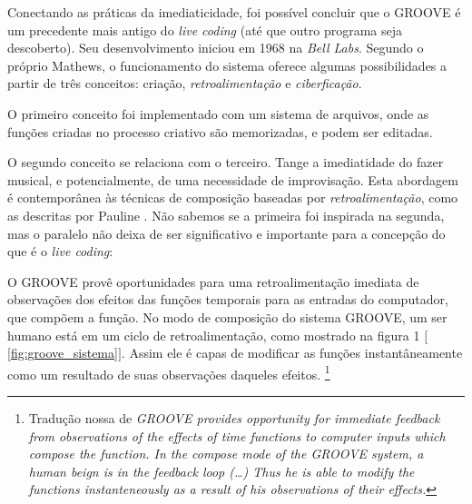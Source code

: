 Conectando as práticas da imediaticidade, foi possível concluir que o GROOVE \cite{mathews_groove_1970,di_nunzio_genesi_2010} é um precedente mais antigo do \emph{live coding} (até que outro programa seja descoberto). Seu desenvolvimento iniciou em 1968 na \emph{Bell Labs}. Segundo o próprio Mathews, o funcionamento do sistema oferece algumas possibilidades a partir de três conceitos: criação, \emph{retroalimentação} e \emph{ciberficação}. 

O primeiro conceito foi implementado com um sistema de arquivos, onde as funções criadas no processo criativo são memorizadas, e podem ser editadas.

O segundo conceito se relaciona com o terceiro. Tange a imediatidade do fazer musical, e potencialmente, de uma necessidade de improvisação. Esta abordagem é contemporânea às técnicas de composição baseadas por \emph{retroalimentação}, como as descritas por Pauline . Não sabemos se a primeira foi inspirada na segunda, mas o paralelo não deixa de ser significativo e importante para a concepção do que é o \emph{live coding}:

\begin{citacao}
O GROOVE provê oportunidades para uma retroalimentação imediata de observações dos efeitos das funções temporais para as entradas do computador, que compõem a função. No modo de composição do sistema GROOVE, um ser humano está em um ciclo de retroalimentação, como mostrado na figura 1 $[$\autoref{fig:groove_sistema}$]$. Assim ele é capas de modificar as funções instantâneamente como um resultado de suas observações daqueles efeitos.\cite[p.~715]{mathews_groove_1970}
\footnote{Tradução nossa de \emph{GROOVE provides opportunity for immediate feedback from observations of the effects of time functions to computer inputs which compose the function. In the compose mode of the GROOVE system, a human beign is in the feedback loop (\ldots) Thus he is able to modify the functions instanteneously as a result of his observations of their effects.}}
\end{citacao}

